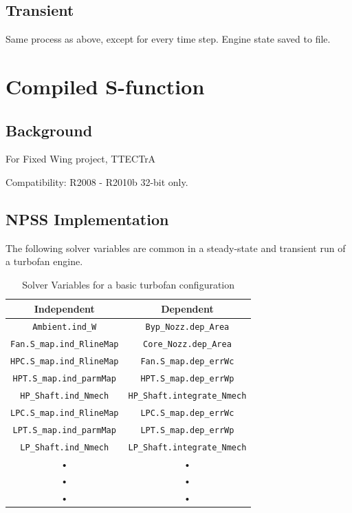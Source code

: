 \documentclass[heading.tex]{subfiles}
\begin{document}
\subsection{Transient}

Same process as above, except for every time step. Engine state saved to file.

\section{Compiled S-function}
\subsection{Background}
For Fixed Wing project, TTECTrA

Compatibility: R2008 - R2010b 32-bit only.

\subsection{NPSS Implementation}

The following solver variables are common in a steady-state and transient run of a turbofan engine.

\begin{table}[H]
\centering
\begin{tabular}{|c|c|}
\hline 
Independent & Dependent \\ 
\hline \hline
\texttt{Ambient.ind\_W} & \texttt{Byp\_Nozz.dep\_Area} \\ 
\hline 
\texttt{Fan.S\_map.ind\_RlineMap} & \texttt{Core\_Nozz.dep\_Area} \\ 
\hline 
\texttt{HPC.S\_map.ind\_RlineMap} & \texttt{Fan.S\_map.dep\_errWc} \\ 
\hline 
\texttt{HPT.S\_map.ind\_parmMap} & \texttt{HPT.S\_map.dep\_errWp} \\ 
\hline 
\texttt{HP\_Shaft.ind\_Nmech} & \texttt{HP\_Shaft.integrate\_Nmech} \\ 
\hline 
\texttt{LPC.S\_map.ind\_RlineMap} & \texttt{LPC.S\_map.dep\_errWc} \\ 
\hline 
\texttt{LPT.S\_map.ind\_parmMap} & \texttt{LPT.S\_map.dep\_errWp} \\ 
\hline 
\texttt{LP\_Shaft.ind\_Nmech} & \texttt{LP\_Shaft.integrate\_Nmech} \\ 
\hline 
• & • \\ 
\hline 
• & • \\ 
\hline 
• & • \\ 
\hline 
\end{tabular} 
\caption{Solver Variables for a basic turbofan configuration}
\label{tab:SolverVariables}
\end{table}
\end{document}
